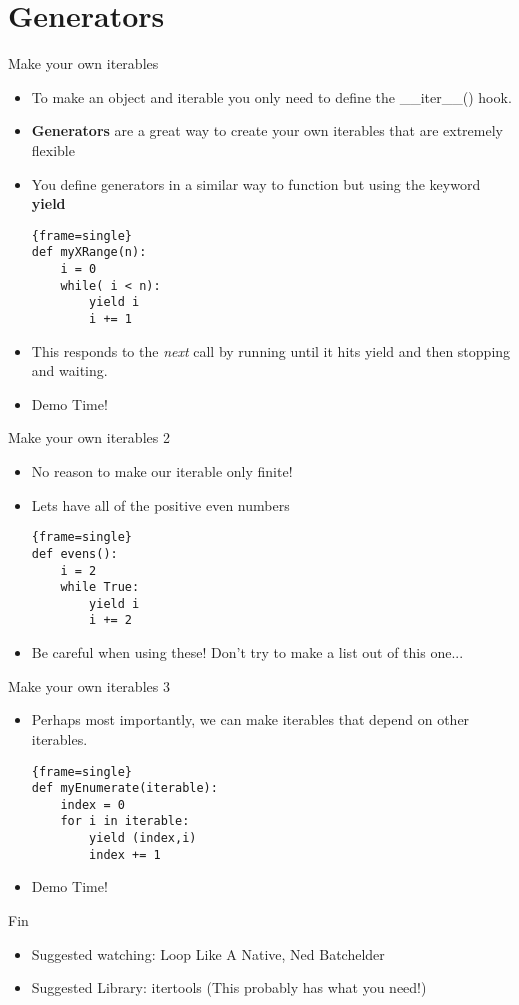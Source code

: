 \documentclass{beamer}
\begin{document}
\section{Generators}
\begin{frame}[fragile]{Make your own iterables}
  \begin{itemize}
  \item{ To make an object and iterable you only need to define the \_\_iter\_\_() hook.}
  \item{\textbf{Generators} are a great way to create your own iterables that are extremely flexible}
  \pause
  \item{You define generators in a similar way to function but using the keyword \textbf{yield}
  \begin{block}{}
\begin{lstlisting}{frame=single}
def myXRange(n):
    i = 0
    while( i < n):
        yield i
        i += 1
\end{lstlisting}
\end{block}
}
\pause
\item This responds to the \emph{next} call by running until it hits yield and then stopping and waiting.
\pause
\item Demo Time!
\end{itemize}
\end{frame}

\begin{frame}[fragile]{Make your own iterables 2}
  \begin{itemize}
\item No reason to make our iterable only finite!
\item{ Lets have all of the positive even numbers
\begin{block}{}
\begin{lstlisting}{frame=single}
def evens():
    i = 2
    while True:
        yield i
        i += 2
\end{lstlisting}
\end{block}
}
\pause
\item Be careful when using these! Don't try to make a list out of this one...
\end{itemize}
\end{frame}

\begin{frame}[fragile]{Make your own iterables 3}
\begin{itemize}
\item{ Perhaps most importantly, we can make iterables that depend on other iterables.
\pause
\begin{block}{}
\begin{lstlisting}{frame=single}
def myEnumerate(iterable):
    index = 0
    for i in iterable:
        yield (index,i)
        index += 1
\end{lstlisting}
\end{block}
}
\item Demo Time!
\end{itemize}
\end{frame}

\begin{frame}[fragile]{Fin}
\begin{itemize}
\item Suggested watching: Loop Like A Native, Ned Batchelder
\item Suggested Library: itertools (This probably has what you need!)
\end{itemize}
\end{frame}
\end{document}
